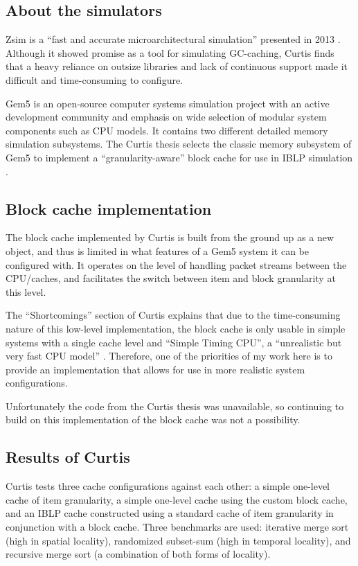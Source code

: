 \documentclass[12pt,twoside]{reedthesis}
\begin{document}
	\subsection*{About the simulators}

	Zsim is a ``fast and accurate microarchitectural simulation'' presented in 2013 \cite{zsim}. Although it showed promise as a tool for simulating GC-caching, Curtis finds that a heavy reliance on outsize libraries and lack of continuous support made it difficult and time-consuming to configure.

	Gem5 is an open-source computer systems simulation project with an active development community and emphasis on wide selection of modular system components such as CPU models. It contains two different detailed memory simulation subsystems. The Curtis thesis selects the classic memory subsystem of Gem5 to implement a ``granularity-aware'' block cache for use in IBLP simulation \cite{curtis}.

	\subsection*{Block cache implementation}

	The block cache implemented by Curtis is built from the ground up as a new object, and thus is limited in what features of a Gem5 system it can be configured with. It operates on the level of handling packet streams between the CPU/caches, and facilitates the switch between item and block granularity at this level.

	The ``Shortcomings'' section of Curtis explains that due to the time-consuming nature of this low-level implementation, the block cache is only usable in simple systems with a single cache level and ``Simple Timing CPU'', a ``unrealistic but very fast CPU model'' \cite{curtis}. Therefore, one of the priorities of my work here is to provide an implementation that allows for use in more realistic system configurations.

	Unfortunately the code from the Curtis thesis was unavailable, so continuing to build on this implementation of the block cache was not a possibility.

	\subsection*{Results of Curtis}

	Curtis tests three cache configurations against each other: a simple one-level cache of item granularity, a simple one-level cache using the custom block cache, and an IBLP cache constructed using a standard cache of item granularity in conjunction with a block cache. Three benchmarks are used: iterative merge sort (high in spatial locality), randomized subset-sum (high in temporal locality), and recursive merge sort (a combination of both forms of locality).
	
\end{document}
